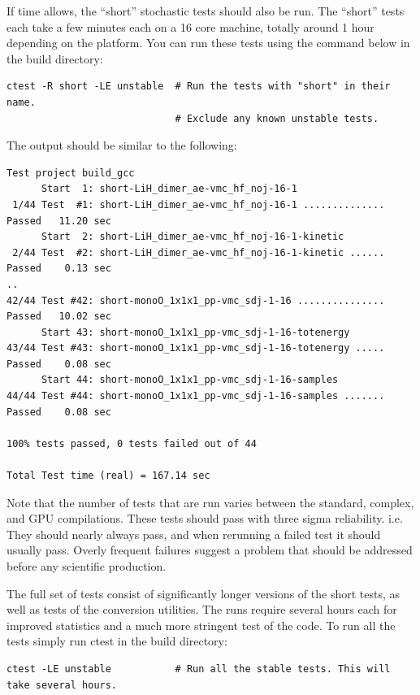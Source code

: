 If time allows, the ``short'' stochastic tests should also be run.
The ``short'' tests each take a few minutes each on a 16
core machine, totally around 1 hour depending on the platform. You can run these tests using the command below in the
build directory:

\verbatimfont{\footnotesize}
\begin{verbatim}
ctest -R short -LE unstable  # Run the tests with "short" in their name.
                             # Exclude any known unstable tests.
\end{verbatim}
The output should be similar to the following:
\verbatimfont{\footnotesize}
\begin{verbatim}
Test project build_gcc
      Start  1: short-LiH_dimer_ae-vmc_hf_noj-16-1
 1/44 Test  #1: short-LiH_dimer_ae-vmc_hf_noj-16-1 ..............  Passed   11.20 sec
      Start  2: short-LiH_dimer_ae-vmc_hf_noj-16-1-kinetic
 2/44 Test  #2: short-LiH_dimer_ae-vmc_hf_noj-16-1-kinetic ......  Passed    0.13 sec
..
42/44 Test #42: short-monoO_1x1x1_pp-vmc_sdj-1-16 ...............  Passed   10.02 sec
      Start 43: short-monoO_1x1x1_pp-vmc_sdj-1-16-totenergy
43/44 Test #43: short-monoO_1x1x1_pp-vmc_sdj-1-16-totenergy .....  Passed    0.08 sec
      Start 44: short-monoO_1x1x1_pp-vmc_sdj-1-16-samples
44/44 Test #44: short-monoO_1x1x1_pp-vmc_sdj-1-16-samples .......  Passed    0.08 sec

100% tests passed, 0 tests failed out of 44

Total Test time (real) = 167.14 sec
\end{verbatim}

Note that the number of tests that are run varies between the
standard, complex, and GPU compilations. These tests should pass with three sigma reliability. i.e. They should nearly always pass, and when rerunning a failed test it should usually pass. Overly frequent failures suggest a problem that should be addressed before any scientific production.

The  full set of tests consist of significantly longer versions of the short
tests, as well as tests of the conversion utilities. The runs require
several hours each for improved statistics and a much more
stringent test of the code. To run all the tests simply run ctest in the build
directory:

\verbatimfont{\footnotesize}
\begin{verbatim}
ctest -LE unstable           # Run all the stable tests. This will take several hours.
\end{verbatim}

